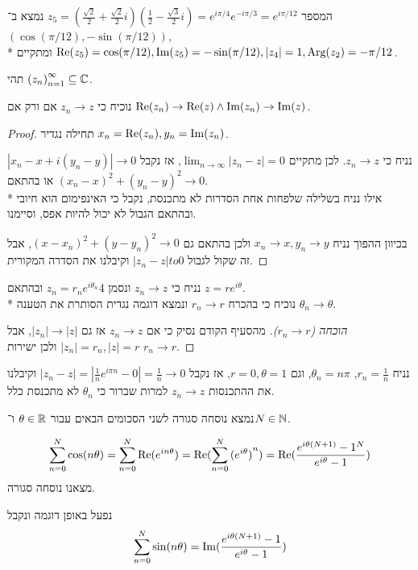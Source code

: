 \Subquestion{}
המספר $z_5 = (\frac{\sqrt{2}}{2} + \frac{\sqrt{2}}{2}i)(\frac{1}{2} - \frac{\sqrt{3}}{2}i) = e^{i \pi / 4} e^{-i\pi/3} = e^{i \pi / 12}$ נמצא ב־$(\cos(\pi/12), -\sin(\pi/12))$, \\*
ומתקיים $\operatorname{Re}(z_5) = \cos(\pi/12), \operatorname{Im}(z_5) = -\sin(\pi/12), |z_4| = 1, \text{Arg}(z_2) = -\pi/12$.

\Question{}
תהי ${(z_n)}_{n = 1}^\infty \subseteq \mathbb{C}$.

\Subquestion{}
נוכיח כי $z_n \to z$ אם ורק אם $\operatorname{Re}(z_n) \to \operatorname{Re}(z) \land \operatorname{Im}(z_n) \to \operatorname{Im}(z)$.
\begin{proof}
	תחילה נגדיר $x_n = \operatorname{Re}(z_n), y_n = \operatorname{Im}(z_n)$.

	נניח כי $z_n \to z$.
	לכן מתקיים $\lim_{n \to \infty} |z_n - z| = 0$, אז נקבל $|x_n - x + i(y_n - y)| \to 0$ או בהתאם ${(x_n - x)}^2 + {(y_n - y)}^2 \to 0$. \\*
	אילו נניח בשלילה שלפחות אחת הסדרות לא מתכנסת, נקבל כי האינפימום הוא חיובי ובהתאם הגבול לא יכול להיות אפס, וסיימנו.

	בכיוון ההפוך נניח $x_n \to x, y_n \to y$ ולכן בהתאם גם ${(x - x_n)}^2 + {(y - y_n)}^2 \to 0$, אבל זה שקול לגבול $|z_n - z| to 0$ וקיבלנו את הסדרה המקורית.
\end{proof}

\Subquestion{}
נניח כי $z_n \to z$ ונסמן 4$z_n = r_n e^{i \theta_n}$ ובהתאם $z = r e^{i\theta}$. \\*
נוכיח כי בהכרח $r_n \to r$ ונמצא דוגמה נגדית הסותרת את הטענה $\theta_n \to \theta$.
\begin{proof}[הוכחה ($r_n \to r$)]
	מהסעיף הקודם נסיק כי אם $z_n \to z$ אז גם $|z_n| \to |z|$, אבל $|z_n| = r_n, |z| = r$ ולכן ישירות $r_n \to r$.
\end{proof}
\begin{solution}
	נניח $r_n = \frac{1}{n}$, $\theta_n = n \pi$, וגם $r = 0, \theta = 1$, אז נקבל $|z_n - z| = |\frac{1}{n} e^{i\pi n} - 0| = \frac{1}{n} \to 0$ וקיבלנו את ההתכנסות $z_n \to z$ למרות שברור כי $\theta_n$ לא מתכנסת כלל.
\end{solution}

\Question{}
נמצא נוסחה סגורה לשני הסכומים הבאים עבור $\theta \in \mathbb{R}$ ו־$N \in \mathbb{N}$.

\Subquestion{}
\[
	\sum_{n = 0}^N \cos(n \theta)
	= \sum_{n = 0}^N \operatorname{Re}(e^{in\theta})
	= \operatorname{Re}( \sum_{n = 0}^N {(e^{i\theta})}^n )
	= \operatorname{Re} (\frac{e^{i\theta (N + 1)} - 1^N}{e^{i\theta} - 1})
\]
מצאנו נוסחה סגורה.

\Subquestion{}
נפעל באופן דוגמה ונקבל
\[
	\sum_{n = 0}^N \sin(n \theta)
	= \operatorname{Im} (\frac{e^{i\theta (N + 1)} - 1}{e^{i\theta} - 1})
\]

